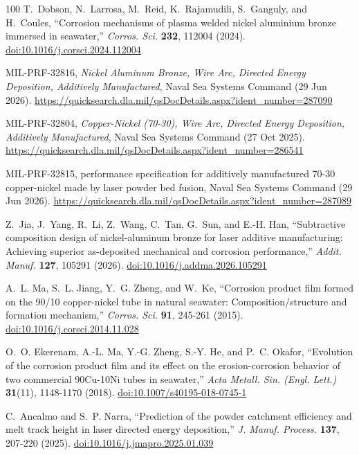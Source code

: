 \documentclass[12pt,letterpaper]{article}
\begin{document}
\begin{thebibliography}{100}
T.~Dobson, N.~Larrosa, M.~Reid, K.~Rajamudili, S.~Ganguly, and H.~Coules, ``Corrosion mechanisms of plasma welded nickel aluminium bronze immersed in seawater,'' \emph{Corros. Sci.} \textbf{232}, 112004 (2024).
\href{https://doi.org/10.1016/j.corsci.2024.112004}{doi:10.1016/j.corsci.2024.112004}

MIL-PRF-32816, \emph{Nickel Aluminum Bronze, Wire Arc, Directed Energy Deposition, Additively Manufactured}, Naval Sea Systems Command (29 Jun 2026).
\url{https://quicksearch.dla.mil/qsDocDetails.aspx?ident_number=287090}

MIL-PRF-32804, \emph{Copper-Nickel (70-30), Wire Arc, Directed Energy Deposition, Additively Manufactured}, Naval Sea Systems Command (27 Oct 2025).
\url{https://quicksearch.dla.mil/qsDocDetails.aspx?ident_number=286541}

MIL-PRF-32815, performance specification for additively manufactured 70-30 copper-nickel made by laser powder bed fusion, Naval Sea Systems Command (29 Jun 2026).
\url{https://quicksearch.dla.mil/qsDocDetails.aspx?ident_number=287089}

Z.~Jia, J.~Yang, R.~Li, Z.~Wang, C.~Tan, G.~Sun, and E.-H. Han, ``Subtractive composition design of nickel-aluminum bronze for laser additive manufacturing: Achieving superior as-deposited mechanical and corrosion performance,'' \emph{Addit. Manuf.} \textbf{127}, 105291 (2026).
\href{https://doi.org/10.1016/j.addma.2026.105291}{doi:10.1016/j.addma.2026.105291}

A.~L. Ma, S.~L. Jiang, Y.~G. Zheng, and W.~Ke, ``Corrosion product film formed on the 90/10 copper-nickel tube in natural seawater: Composition/structure and formation mechanism,'' \emph{Corros. Sci.} \textbf{91}, 245-261 (2015).
\href{https://doi.org/10.1016/j.corsci.2014.11.028}{doi:10.1016/j.corsci.2014.11.028}

O.~O. Ekerenam, A.-L. Ma, Y.-G. Zheng, S.-Y. He, and P.~C. Okafor, ``Evolution of the corrosion product film and its effect on the erosion-corrosion behavior of two commercial 90Cu-10Ni tubes in seawater,'' \emph{Acta Metall. Sin. (Engl. Lett.)} \textbf{31}(11), 1148-1170 (2018).
\href{https://doi.org/10.1007/s40195-018-0745-1}{doi:10.1007/s40195-018-0745-1}

C.~Ancalmo and S.~P. Narra, ``Prediction of the powder catchment efficiency and melt track height in laser directed energy deposition,'' \emph{J. Manuf. Process.} \textbf{137}, 207-220 (2025).
\href{https://doi.org/10.1016/j.jmapro.2025.01.039}{doi:10.1016/j.jmapro.2025.01.039}


\end{thebibliography}
\end{document}
